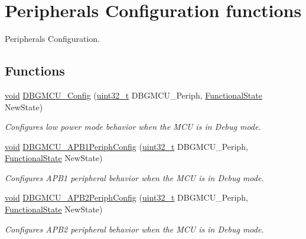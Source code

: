 \hypertarget{group___d_b_g_m_c_u___group2}{\section{Peripherals Configuration functions}
\label{group___d_b_g_m_c_u___group2}
}


Peripherals Configuration.  


\subsection*{Functions}
\begin{DoxyCompactItemize}
\item 
\hyperlink{group___n_a_m_e_ga18028b8badbf1ea7e704ccac3c488e82}{void} \hyperlink{group___d_b_g_m_c_u___group2_gadf2f267f855ac1e4c03905c5dcfbd28b}{D\-B\-G\-M\-C\-U\-\_\-\-Config} (\hyperlink{stdint_8h_a435d1572bf3f880d55459d9805097f62}{uint32\-\_\-t} D\-B\-G\-M\-C\-U\-\_\-\-Periph, \hyperlink{group___exported__types_gac9a7e9a35d2513ec15c3b537aaa4fba1}{Functional\-State} New\-State)
\begin{DoxyCompactList}\small\item\em Configures low power mode behavior when the M\-C\-U is in Debug mode. \end{DoxyCompactList}\item 
\hyperlink{group___n_a_m_e_ga18028b8badbf1ea7e704ccac3c488e82}{void} \hyperlink{group___d_b_g_m_c_u___group2_ga71349f1435471f71979c742360df88f0}{D\-B\-G\-M\-C\-U\-\_\-\-A\-P\-B1\-Periph\-Config} (\hyperlink{stdint_8h_a435d1572bf3f880d55459d9805097f62}{uint32\-\_\-t} D\-B\-G\-M\-C\-U\-\_\-\-Periph, \hyperlink{group___exported__types_gac9a7e9a35d2513ec15c3b537aaa4fba1}{Functional\-State} New\-State)
\begin{DoxyCompactList}\small\item\em Configures A\-P\-B1 peripheral behavior when the M\-C\-U is in Debug mode. \end{DoxyCompactList}\item 
\hyperlink{group___n_a_m_e_ga18028b8badbf1ea7e704ccac3c488e82}{void} \hyperlink{group___d_b_g_m_c_u___group2_ga2f5ed438cada1be09ea51c42419be3a8}{D\-B\-G\-M\-C\-U\-\_\-\-A\-P\-B2\-Periph\-Config} (\hyperlink{stdint_8h_a435d1572bf3f880d55459d9805097f62}{uint32\-\_\-t} D\-B\-G\-M\-C\-U\-\_\-\-Periph, \hyperlink{group___exported__types_gac9a7e9a35d2513ec15c3b537aaa4fba1}{Functional\-State} New\-State)
\begin{DoxyCompactList}\small\item\em Configures A\-P\-B2 peripheral behavior when the M\-C\-U is in Debug mode. \end{DoxyCompactList}\end{DoxyCompactItemize}


